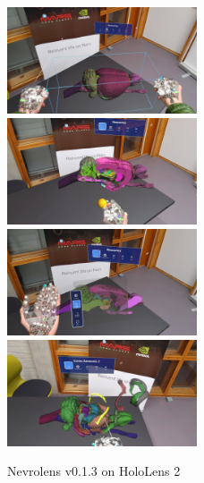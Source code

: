 \begin{figure}[h]\label{fig:nevrolens_holo}
    \includegraphics[width=0.5\textwidth]{fig/nevrolens/twohandedzoom.jpg}
    \includegraphics[width=0.5\textwidth]{fig/nevrolens/clipping.jpg}
    \includegraphics[width=0.5\textwidth]{fig/nevrolens/palmmenu.jpg}
    \includegraphics[width=0.5\textwidth]{fig/nevrolens/brainpartsout.jpg}
    \caption{Nevrolens v0.1.3 on HoloLens 2}
\end{figure}


